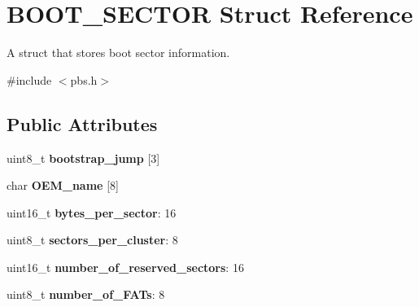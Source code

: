 \hypertarget{struct_b_o_o_t___s_e_c_t_o_r}{}\section{B\+O\+O\+T\+\_\+\+S\+E\+C\+T\+O\+R Struct Reference}
\label{struct_b_o_o_t___s_e_c_t_o_r}


A struct that stores boot sector information.  




{\ttfamily \#include $<$pbs.\+h$>$}

\subsection*{Public Attributes}
\begin{DoxyCompactItemize}
\item 
\hypertarget{struct_b_o_o_t___s_e_c_t_o_r_ac8d8bc799ce79624e07d00e40cb5f7ae}{}uint8\+\_\+t {\bfseries bootstrap\+\_\+jump} \mbox{[}3\mbox{]}\label{struct_b_o_o_t___s_e_c_t_o_r_ac8d8bc799ce79624e07d00e40cb5f7ae}

\item 
\hypertarget{struct_b_o_o_t___s_e_c_t_o_r_abfec0987eb6304b32001a3d08abf187e}{}char {\bfseries O\+E\+M\+\_\+name} \mbox{[}8\mbox{]}\label{struct_b_o_o_t___s_e_c_t_o_r_abfec0987eb6304b32001a3d08abf187e}

\item 
\hypertarget{struct_b_o_o_t___s_e_c_t_o_r_ac11b58ff395b5d152c8e082c914c82cb}{}uint16\+\_\+t {\bfseries bytes\+\_\+per\+\_\+sector}\+: 16\label{struct_b_o_o_t___s_e_c_t_o_r_ac11b58ff395b5d152c8e082c914c82cb}

\item 
\hypertarget{struct_b_o_o_t___s_e_c_t_o_r_a475bae2ca4427ea08af2d63c84df1c2c}{}uint8\+\_\+t {\bfseries sectors\+\_\+per\+\_\+cluster}\+: 8\label{struct_b_o_o_t___s_e_c_t_o_r_a475bae2ca4427ea08af2d63c84df1c2c}

\item 
\hypertarget{struct_b_o_o_t___s_e_c_t_o_r_af89f00a693b29e43dcf4321e9466f715}{}uint16\+\_\+t {\bfseries number\+\_\+of\+\_\+reserved\+\_\+sectors}\+: 16\label{struct_b_o_o_t___s_e_c_t_o_r_af89f00a693b29e43dcf4321e9466f715}

\item 
\hypertarget{struct_b_o_o_t___s_e_c_t_o_r_a2e05b4f728a6d5daf7bafc678507cbd4}{}uint8\+\_\+t {\bfseries number\+\_\+of\+\_\+\+F\+A\+Ts}\+: 8\label{struct_b_o_o_t___s_e_c_t_o_r_a2e05b4f728a6d5daf7bafc678507cbd4}


\end{DoxyCompactItemize}
